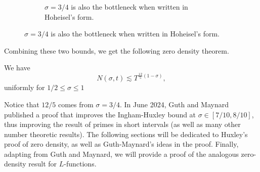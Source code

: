 \begin{figure}[h]
\begin{subfigure}{0.4\textwidth}
        \caption{$\sigma=3/4$ is also the bottleneck when written in Hoheisel's form.}
    \end{subfigure}
\end{figure}
Combining these two bounds, we get the following zero density theorem.
\begin{theorem}
   We have \[
    N(\sigma,t)\lesssim T^{\frac{12}{5}(1-\sigma)},
    \]
    uniformly for $1/2\leq \sigma\leq 1$
\end{theorem}
Notice that $12/5$ comes from $\sigma = 3/4$. In June 2024, Guth and Maynard published a proof that improves the Ingham-Huxley bound at $\sigma \in [7/10,8/10]$, thus improving the result of primes in short intervals (as well as many other number theoretic results). The following sections will be dedicated to Huxley's proof of zero density, as well as Guth-Maynard's ideas in the proof. Finally, adapting from Guth and Maynard, we will provide a proof of the analogous zero-density result for $L$-functions.